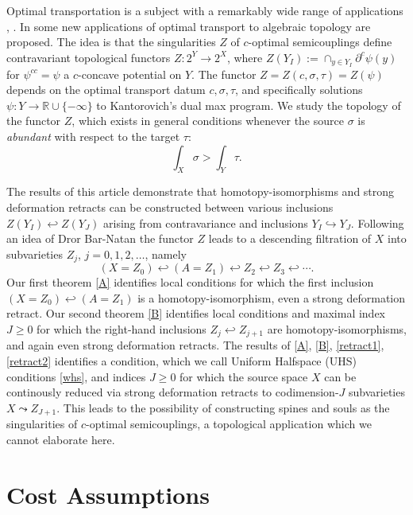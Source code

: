 \documentclass[12pt]{amsart}
\theoremstyle{definition}
\theoremstyle{remark}
\newcommand{\bR}{\mathbb{R}}
\newcommand{\del}{\partial}
\newcommand{\ysub}{\del^c \psi(y)}
\begin{document}
Optimal transportation is a subject with a remarkably wide range of applications \cite{Vil1}, \cite{Vil2}. In \cite{martel} some new applications of optimal transport to algebraic topology are proposed. The idea is that the singularities $Z$ of $c$-optimal semicouplings define contravariant topological functors $Z: 2^Y \to 2^X$, where $Z(Y_I):=\cap_{y\in Y_I} \ysub$ for $\psi^{cc}=\psi$ a $c$-concave potential on $Y$. The functor $Z=Z(c,\sigma, \tau)=Z(\psi)$ depends on the optimal transport datum $c, \sigma, \tau$, and specifically solutions $\psi: Y \to \bR \cup \{-\infty\}$ to Kantorovich's dual max program. We study the topology of the functor $Z$, which exists in general conditions whenever the source $\sigma$ is \emph{abundant} with respect to the target $\tau$:  \begin{equation}\label{abundant}\int_X \sigma > \int_Y \tau. \end{equation} 

The results of this article demonstrate that homotopy-isomorphisms and strong deformation retracts can be constructed between various inclusions $Z(Y_I) \hookleftarrow Z(Y_J)$ arising from contravariance and inclusions $Y_I\hookrightarrow Y_J$. Following an idea of Dror Bar-Natan \cite{Bar2002} the functor $Z$ leads to a descending filtration of $X$ into subvarieties $Z_j$, $j=0,1,2, \ldots$, namely \begin{equation}\label{filt}
(X=Z_0) \hookleftarrow (A=Z_1) \hookleftarrow Z_2 \hookleftarrow Z_3 \hookleftarrow \cdots .
\end{equation}
Our first theorem \ref{A} identifies local conditions for which the first inclusion $(X=Z_0) \hookleftarrow (A=Z_1)$ is a homotopy-isomorphism, even a strong deformation retract. Our second theorem \ref{B} identifies local conditions and maximal index $J\geq 0$ for which the right-hand inclusions $Z_j \hookleftarrow Z_{j+1}$ are homotopy-isomorphisms, and again even strong deformation retracts. The results of \ref{A}, \ref{B}, \ref{retract1}, \ref{retract2} identifies a condition, which we call Uniform Halfspace (UHS) conditions \ref{whs}, and indices $J\geq 0$ for which the source space $X$ can be continously reduced via strong deformation retracts to codimension-$J$ subvarieties $X \leadsto Z_{J+1} $. This leads to the possibility of constructing spines and souls as the singularities of $c$-optimal semicouplings, a topological application which we cannot elaborate here.



\section{Cost Assumptions}\label{costassump}
\end{document}
